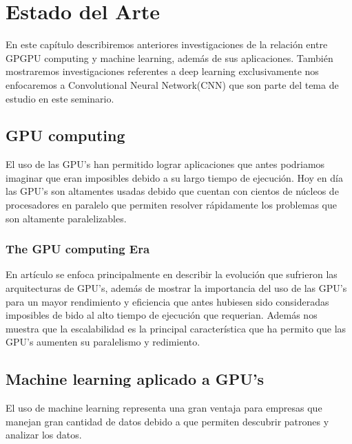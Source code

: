 \chapter{Estado del Arte}
En este capítulo describiremos anteriores investigaciones de la relación entre GPGPU computing y machine learning, además de sus aplicaciones. También mostraremos investigaciones referentes a deep learning exclusivamente nos enfocaremos a Convolutional Neural Network(CNN) que son parte del tema de estudio en este seminario. 




\section{GPU computing}
El uso de las GPU's han permitido lograr aplicaciones que antes podriamos imaginar que eran imposibles debido a su largo tiempo de ejecución. Hoy en día las GPU's son altamentes usadas debido que cuentan con cientos de núcleos de procesadores en paralelo que permiten resolver rápidamente los problemas que son altamente paralelizables.
\subsection{The GPU computing Era}
	En artículo se enfoca principalmente en describir la evolución que sufrieron las arquitecturas de GPU's, además de mostrar la importancia del uso de las GPU's para un mayor rendimiento y eficiencia que antes hubiesen sido consideradas imposibles de	bido al alto tiempo de ejecución que requerian. Además nos muestra que la escalabilidad es la principal característica que ha permito que las GPU's aumenten su paralelismo y redimiento.
\section{Machine learning aplicado a GPU's}
El uso de machine learning representa una gran ventaja para empresas que manejan gran cantidad de datos debido a que permiten descubrir patrones y analizar los datos.


